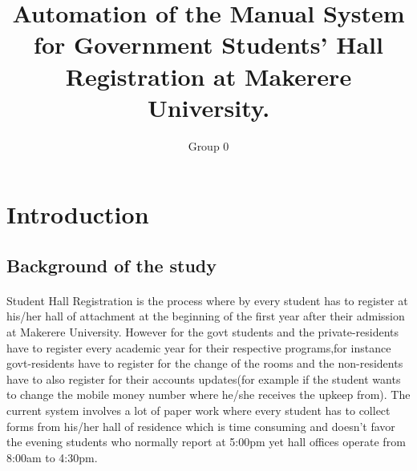 \documentclass[12pt]{article}
\begin{document}
	\title{Automation of the Manual System for Government Students’ Hall Registration at Makerere University.}
	
	\author{Group 0}
	
	\maketitle
	\section{Introduction}
	\subsection{Background of the study}
	\paragraph{}
	Student Hall Registration is the process where by every student has to register at his/her hall of attachment at the beginning of the first year after their admission at Makerere University.
	However for the govt students and the private-residents have to register every academic year for their respective programs,for instance govt-residents have to register for the change of the rooms and the non-residents have to also register for their accounts updates(for example if the student wants to change the mobile money number where he/she receives the upkeep from).
	The current system involves a lot of paper work where every student has to collect forms from his/her hall of residence which is time consuming and  doesn't favor the evening students who normally report at 5:00pm yet hall offices operate from 8:00am  to 4:30pm. 
	

	
	
\end{document}

